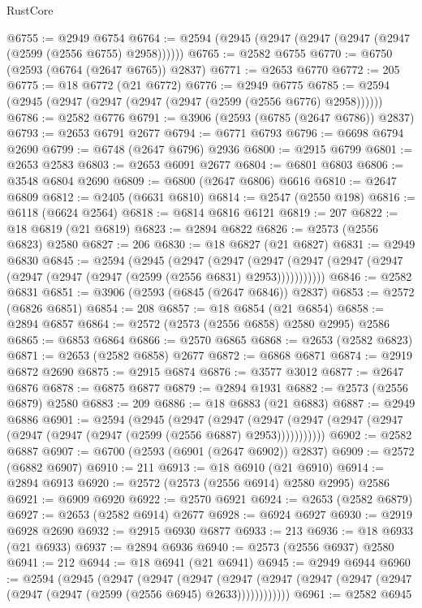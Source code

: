 \begin{lexlean}{RustCore}
\begin{coremodule}
@6755 := @2949 @6754
@6764 := @2594 (@2945 (@2947 (@2947 (@2947 (@2947 (@2599 (@2556 @6755) @2958))))))
@6765 := @2582 @6755
@6770 := @6750 (@2593 (@6764 (@2647 @6765)) @2837)
@6771 := @2653 @6770
@6772 := 205
@6775 := @18 @6772 (@21 @6772)
@6776 := @2949 @6775
@6785 := @2594 (@2945 (@2947 (@2947 (@2947 (@2947 (@2599 (@2556 @6776) @2958))))))
@6786 := @2582 @6776
@6791 := @3906 (@2593 (@6785 (@2647 @6786)) @2837)
@6793 := @2653 @6791 @2677
@6794 := @6771 @6793
@6796 := @6698 @6794 @2690
@6799 := @6748 (@2647 @6796) @2936
@6800 := @2915 @6799
@6801 := @2653 @2583
@6803 := @2653 @6091 @2677
@6804 := @6801 @6803
@6806 := @3548 @6804 @2690
@6809 := @6800 (@2647 @6806) @6616
@6810 := @2647 @6809
@6812 := @2405 (@6631 @6810)
@6814 := @2547 (@2550 @198)
@6816 := @6118 (@6624 @2564)
@6818 := @6814 @6816 @6121
@6819 := 207
@6822 := @18 @6819 (@21 @6819)
@6823 := @2894 @6822
@6826 := @2573 (@2556 @6823) @2580
@6827 := 206
@6830 := @18 @6827 (@21 @6827)
@6831 := @2949 @6830
@6845 := @2594
    (@2945
      (@2947
        (@2947
          (@2947 (@2947 (@2947 (@2947 (@2947 (@2947 (@2947 (@2599 (@2556 @6831) @2953)))))))))))
@6846 := @2582 @6831
@6851 := @3906 (@2593 (@6845 (@2647 @6846)) @2837)
@6853 := @2572 (@6826 @6851)
@6854 := 208
@6857 := @18 @6854 (@21 @6854)
@6858 := @2894 @6857
@6864 := @2572 (@2573 (@2556 @6858) @2580 @2995) @2586
@6865 := @6853 @6864
@6866 := @2570 @6865
@6868 := @2653 (@2582 @6823)
@6871 := @2653 (@2582 @6858) @2677
@6872 := @6868 @6871
@6874 := @2919 @6872 @2690
@6875 := @2915 @6874
@6876 := @3577 @3012
@6877 := @2647 @6876
@6878 := @6875 @6877
@6879 := @2894 @1931
@6882 := @2573 (@2556 @6879) @2580
@6883 := 209
@6886 := @18 @6883 (@21 @6883)
@6887 := @2949 @6886
@6901 := @2594
    (@2945
      (@2947
        (@2947
          (@2947 (@2947 (@2947 (@2947 (@2947 (@2947 (@2947 (@2599 (@2556 @6887) @2953)))))))))))
@6902 := @2582 @6887
@6907 := @6700 (@2593 (@6901 (@2647 @6902)) @2837)
@6909 := @2572 (@6882 @6907)
@6910 := 211
@6913 := @18 @6910 (@21 @6910)
@6914 := @2894 @6913
@6920 := @2572 (@2573 (@2556 @6914) @2580 @2995) @2586
@6921 := @6909 @6920
@6922 := @2570 @6921
@6924 := @2653 (@2582 @6879)
@6927 := @2653 (@2582 @6914) @2677
@6928 := @6924 @6927
@6930 := @2919 @6928 @2690
@6932 := @2915 @6930 @6877
@6933 := 213
@6936 := @18 @6933 (@21 @6933)
@6937 := @2894 @6936
@6940 := @2573 (@2556 @6937) @2580
@6941 := 212
@6944 := @18 @6941 (@21 @6941)
@6945 := @2949 @6944
@6960 := @2594
    (@2945
      (@2947
        (@2947
          (@2947
            (@2947 (@2947 (@2947 (@2947 (@2947 (@2947 (@2947 (@2599 (@2556 @6945) @2633))))))))))))
@6961 := @2582 @6945

\end{coremodule}
\end{lexlean}
